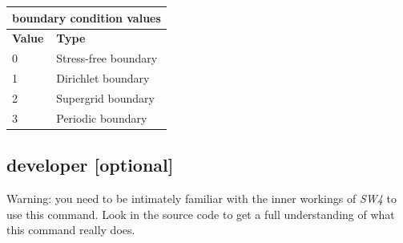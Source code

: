\documentclass[11pt]{report}
\begin{document}
{\begin{center}
	\begin{tabular}{|l|p{10cm}|} \hline
		\multicolumn{2}{|c|}{\bf boundary condition values } \\ \hline
		\bf{Value} & \bf{Type}                               \\ \hline \hline
		0          & Stress-free boundary                    \\ \hline
		1          & Dirichlet boundary                      \\ \hline
		2          & Supergrid boundary                      \\ \hline
		3          & Periodic boundary                       \\ \hline
	\end{tabular}
\end{center}

\subsection{developer [optional]}
\label{keyword:developer}
Warning: you need to be intimately familiar with the inner workings of \emph{SW4} to use this
command. Look in the source code to get a full understanding of what this command really does.

}
\end{document}
